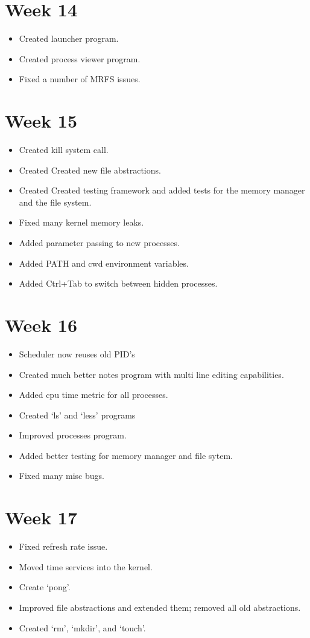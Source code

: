 \documentclass[a4paper]{report}
\begin{document}
\section*{Week 14}
\begin{itemize}
\item Created launcher program.
\item Created process viewer program.
\item Fixed a number of MRFS issues.
\end{itemize}

\section*{Week 15}
\begin{itemize}
\item Created kill system call.
\item Created Created new file abstractions.
\item Created Created testing framework and added tests for the memory manager and the file system.
\item Fixed many kernel memory leaks.
\item Added parameter passing to new processes.
\item Added PATH and cwd environment variables.
\item Added Ctrl+Tab to switch between hidden processes.
\end{itemize}

\section*{Week 16}
\begin{itemize}
\item Scheduler now reuses old PID's
\item Created much better notes program with multi line editing capabilities.
\item Added cpu time metric for all processes.
\item Created `ls' and `less' programs
\item Improved processes program.
\item Added better testing for memory manager and file sytem.
\item Fixed many misc bugs.
\end{itemize}

\section*{Week 17}
\begin{itemize}
\item Fixed refresh rate issue.
\item Moved time services into the kernel.
\item Create `pong'.
\item Improved file abstractions and extended them; removed all old abstractions.
\item Created `rm', `mkdir', and `touch'.
\end{itemize}
\end{document}
